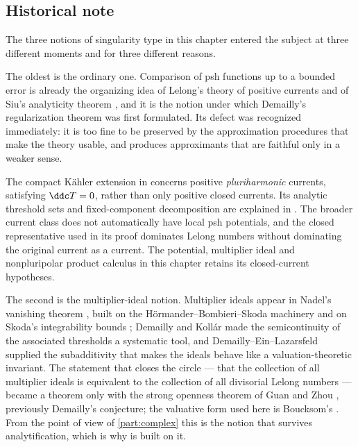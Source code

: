 \subsection{Historical note}
\label{sec:ch51-history}

The three notions of singularity type in this chapter entered the subject
at three different moments and for three different reasons.

The oldest is the ordinary one.  Comparison of psh functions up to a
bounded error is already the organizing idea of Lelong's theory of
positive currents \cite{Lel68} and of Siu's analyticity theorem
\cite{Siu74}, and it is the notion under which Demailly's regularization
theorem \cite{Dem92reg} was first formulated.  Its defect was recognized
immediately: it is too fine to be preserved by the approximation
procedures that make the theory usable, and
 produces approximants that are
faithful only in a weaker sense.

The compact K\"ahler extension in
\cite{DinhNguyenNguyen26SiuV2} concerns positive \emph{pluriharmonic}
currents, satisfying $\ddc T=0$, rather than only positive closed
currents. Its analytic threshold sets and fixed-component decomposition
are explained in . The broader current
class does not automatically have local psh potentials, and the closed
representative used in its proof dominates Lelong numbers without
dominating the original current as a current. The potential, multiplier
ideal and nonpluripolar product calculus in this chapter retains its
closed-current hypotheses.

The second is the multiplier-ideal notion.  Multiplier ideals appear in
Nadel's vanishing theorem \cite{Nad90}, built on the
H\"ormander--Bombieri--Skoda machinery and on Skoda's integrability
bounds \cite{Sko72}; Demailly and Kollár \cite{DK01} made the
semicontinuity of the associated thresholds a systematic tool, and
Demailly--Ein--Lazarsfeld \cite{DEL00} supplied the subadditivity that
makes the ideals behave like a valuation-theoretic invariant.  The
statement that closes the circle --- that the collection of all
multiplier ideals is equivalent to the collection of all divisorial
Lelong numbers --- became a theorem only with the strong openness theorem
of Guan and Zhou \cite{GZ15}, previously Demailly's conjecture; the
valuative form used here is Boucksom's \cite{Bou17}.  From the point of
view of \cref{part:complex} this is the notion that survives
analytification, which is why  is
built on it.

